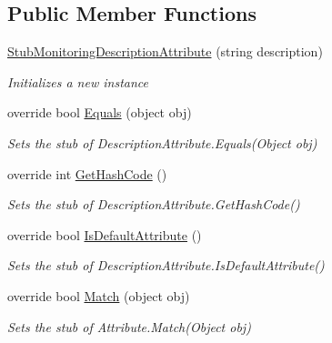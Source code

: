 \subsection*{Public Member Functions}
\begin{DoxyCompactItemize}
\item 
\hyperlink{class_system_1_1_diagnostics_1_1_fakes_1_1_stub_monitoring_description_attribute_ac239ff865d15c9653dec07af8a04c4db}{Stub\-Monitoring\-Description\-Attribute} (string description)
\begin{DoxyCompactList}\small\item\em Initializes a new instance\end{DoxyCompactList}\item 
override bool \hyperlink{class_system_1_1_diagnostics_1_1_fakes_1_1_stub_monitoring_description_attribute_ab4a2bf0cb2db0f386ff239e78609370d}{Equals} (object obj)
\begin{DoxyCompactList}\small\item\em Sets the stub of Description\-Attribute.\-Equals(\-Object obj)\end{DoxyCompactList}\item 
override int \hyperlink{class_system_1_1_diagnostics_1_1_fakes_1_1_stub_monitoring_description_attribute_a622ea92ebd25470a30d061ed28ac2c2a}{Get\-Hash\-Code} ()
\begin{DoxyCompactList}\small\item\em Sets the stub of Description\-Attribute.\-Get\-Hash\-Code()\end{DoxyCompactList}\item 
override bool \hyperlink{class_system_1_1_diagnostics_1_1_fakes_1_1_stub_monitoring_description_attribute_a9a728e72e119a2ad36bc015d0b0868ca}{Is\-Default\-Attribute} ()
\begin{DoxyCompactList}\small\item\em Sets the stub of Description\-Attribute.\-Is\-Default\-Attribute()\end{DoxyCompactList}\item 
override bool \hyperlink{class_system_1_1_diagnostics_1_1_fakes_1_1_stub_monitoring_description_attribute_ab0bfaf575cbd216928fe0f62379d572a}{Match} (object obj)
\begin{DoxyCompactList}\small\item\em Sets the stub of Attribute.\-Match(\-Object obj)\end{DoxyCompactList}\end{DoxyCompactItemize}
